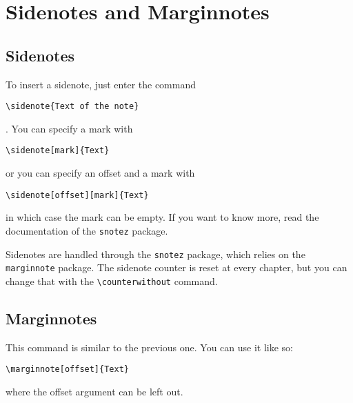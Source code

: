 \setchapterpreamble[u]{\margintoc}
\chapter{Sidenotes and Marginnotes}

\section{Sidenotes}

To insert a sidenote, just enter the command 
\begin{verbatim}
\sidenote{Text of the note}
\end{verbatim}.
You can specify a mark with
\begin{verbatim}
\sidenote[mark]{Text}
\end{verbatim}
or you can specify an offset and a mark with
\begin{verbatim}
\sidenote[offset][mark]{Text}
\end{verbatim}
in which case the mark can be empty. If you want to know more, read the 
documentation of the \verb|snotez| package.

Sidenotes are handled through the \verb|snotez| package, which relies on 
the \verb|marginnote| package. The sidenote counter is reset at every 
chapter, but you can change that with the \verb|\counterwithout| 
command.

\section{Marginnotes}


This command is similar to the previous one. You can use it like so:
\begin{verbatim}
\marginnote[offset]{Text}
\end{verbatim}
where the offset argument can be left out.


